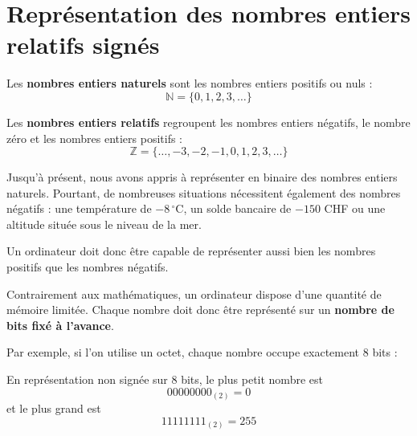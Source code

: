 \documentclass[11pt, a4paper]{book}
\begin{document}
\section{Représentation des nombres entiers relatifs signés}

\begin{definition}
Les \textbf{nombres entiers naturels} sont les nombres entiers positifs ou nuls :
    \[
        \mathbb{N}=\{0,1,2,3,\ldots\}
    \]

Les \textbf{nombres entiers relatifs} regroupent les nombres entiers
    négatifs, le nombre zéro et les nombres entiers positifs :
    \[
        \mathbb{Z}=\{\ldots,-3,-2,-1,0,1,2,3,\ldots\}
    \]

\end{definition}

Jusqu'à présent, nous avons appris à représenter en binaire des nombres
entiers naturels. Pourtant, de nombreuses situations nécessitent également
des nombres négatifs : une température de $-8\,^\circ$C, un solde bancaire
de $-150$ CHF ou une altitude située sous le niveau de la mer.

Un ordinateur doit donc être capable de représenter aussi bien les nombres
positifs que les nombres négatifs.

\begin{remarque}
Contrairement aux mathématiques, un ordinateur dispose d'une quantité de
mémoire limitée. Chaque nombre doit donc être représenté sur un
\textbf{nombre de bits fixé à l'avance}.

Par exemple, si l'on utilise un octet, chaque nombre occupe exactement
8 bits :

\begin{center}
\end{center}

En représentation non signée sur 8 bits, le plus petit nombre est
\[
      00000000_{(2)} = 0
\]
et le plus grand est
\[
    11111111_{(2)} = 255
\]
\end{remarque}
\end{document}
